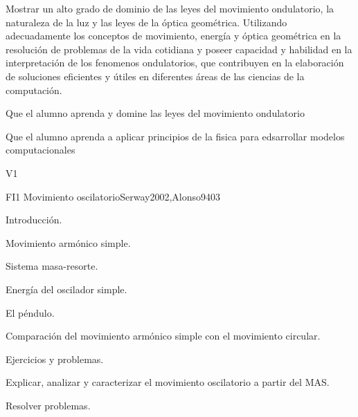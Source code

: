 \begin{syllabus}


\begin{justification}
Mostrar un alto grado de dominio de las leyes del movimiento ondulatorio,
la naturaleza de la luz y las leyes de la óptica geométrica.
Utilizando  adecuadamente los conceptos de movimiento, energía y óptica
geométrica en la resolución de problemas de la vida cotidiana y poseer
capacidad y habilidad en la interpretación de los fenomenos ondulatorios,
que contribuyen en la elaboración de soluciones eficientes y útiles en
diferentes áreas de las ciencias de la computación.
\end{justification}

\begin{goals}
\item Que el alumno aprenda y domine las leyes del movimiento ondulatorio
\item Que el alumno aprenda a aplicar principios de la fisica para edsarrollar modelos computacionales
\end{goals}

\begin{outcomes}{V1}
   \item {}
   \item {}
   \item {}
\end{outcomes}

\begin{unit}{FI1 Movimiento oscilatorio}{}{Serway2002,Alonso94}{0}{3}
\begin{topics}
      \item Introducción.
      \item Movimiento armónico simple.
      \item Sistema masa-resorte.
      \item Energía del oscilador simple.
      \item El péndulo.
      \item Comparación del movimiento armónico simple con el movimiento circular.
      \item Ejercicios y problemas.
   \end{topics}

   \begin{learningoutcomes}
      \item Explicar, analizar y caracterizar el movimiento oscilatorio a partir del MAS.
      \item Resolver problemas.
   \end{learningoutcomes}
\end{unit}


\end{syllabus}
